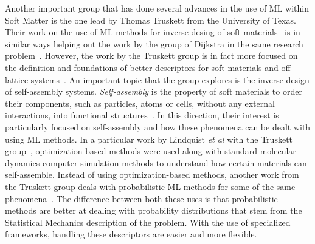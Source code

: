 Another important group that has done several advances in the use of ML within Soft Matter
is the one lead by Thomas Truskett from the University of Texas.
Their work on the use of ML methods for inverse desing of soft materials~\cite{shermanInverseMethodsDesign2020a}
is in similar ways helping out the work by the group of Dijkstra in the same research
problem~\cite{APSAPSMarcha}.
However, the work by the Truskett group is in fact more focused on the definition and
foundations of better descriptors for soft materials and off-lattice systems~\cite{jadrichUnsupervisedMachineLearning2018}.
An important topic that the group explores is the inverse design of self-assembly
systems. \emph{Self-assembly} is the property of soft materials to order their
components, such as particles, atoms or cells, without any external interactions,
into functional structures~\cite{grzybowskiSelfassemblyCrystalsCells2009}.
In this direction, their interest is particularly focused on self-assembly and how these 
phenomena can be dealt with using ML methods.
In a particular work by Lindquist \emph{et al} with the Truskett group~\cite{lindquistCommunicationInverseDesign2016},
optimization-based methods were used along with standard molecular dynamics computer
simulation methods to understand how certain materials can self-assemble.
Instead of using optimization-based methods, another work from the Truskett group
deals with probabilistic ML methods for some of the same phenomena~\cite{jadrichProbabilisticInverseDesign2017}.
The difference between both these uses is that probabilistic methods are better at dealing
with probability distributions that stem from the Statistical Mechanics description of the
problem. With the use of specialized frameworks, handling these descriptors are easier
and more flexible.

